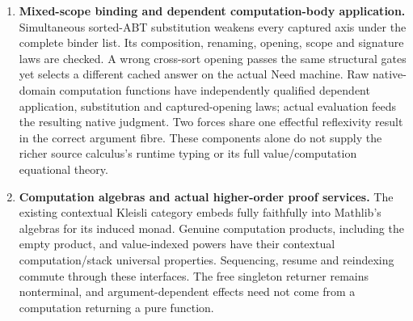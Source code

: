 \documentclass[11pt]{article}
\theoremstyle{definition}
\theoremstyle{remark}
\begin{document}
\begin{enumerate}
  A native-indexed polarized source has actual thunk/function constructors,
  index/closure packets and simultaneous three-scope substitution. Lexical
  execution distinguishes returned values from computation functions and
  ordinary forcing from shared demand. A conservative local-step interface
  enters captured code without adding effects or cells. The complete old
  machine embeds with exact ordered step/frontier/answer correspondence,
  retaining worlds, faults, occurrences and work. Higher-order, mixed-capture,
  indexed-closure and construction-versus-execution sharing controls execute
  the new source. Independent source typing preserves old derivations;
  simultaneous typed substitution and four principal source openings preserve
  the displayed result type. A general admitted producer's selected index
  remains packaged with its identity evidence. A first-class dependent function
  template executes in seven actual transitions for every loaded native
  argument; independent argument admission licenses its returned identity
  proof. Reverse typing conservativity and independent natural adequacy for
  the richer constructors are not consequences of these results.
\item \textbf{Mixed-scope binding and dependent computation-body application.}
  Simultaneous sorted-ABT substitution weakens every captured axis under the
  complete binder list. Its composition, renaming, opening, scope and
  signature laws are checked. A wrong cross-sort opening passes the same
  structural gates yet selects a different cached answer on the actual
  Need machine. Raw native-domain computation functions have independently
  qualified dependent application, substitution and captured-opening laws;
  actual evaluation feeds the resulting native judgment. Two forces share
  one effectful reflexivity result in the correct argument fibre. These
  components alone do not supply the richer source calculus's runtime
  typing or its full value/computation equational theory.
\item \textbf{Computation algebras and actual higher-order proof services.}
  The existing contextual Kleisli category embeds fully faithfully into
  Mathlib's algebras for its induced monad. Genuine computation products,
  including the empty product, and value-indexed powers have their
  contextual computation/stack universal properties. Sequencing, resume
  and reindexing commute through these interfaces. The free singleton
  returner remains nonterminal, and argument-dependent effects need not
  come from a computation returning a pure function.

\end{enumerate}
\end{document}

